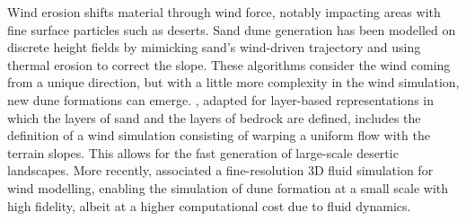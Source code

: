 
\smallConclusion

Wind erosion shifts material through wind force, notably impacting areas with fine surface particles such as deserts.  
Sand dune generation has been modelled on discrete height fields \cite{Roa2004} by mimicking sand's wind-driven trajectory and using thermal erosion to correct the slope. These algorithms consider the wind coming from a unique direction, but with a little more complexity in the wind simulation, new dune formations can emerge. \cite{Paris2019b}, adapted for layer-based representations in which the layers of sand and the layers of bedrock are defined, includes the definition of a wind simulation consisting of warping a uniform flow with the terrain slopes. This allows for the fast generation of large-scale desertic landscapes. More recently, \cite{Rosset2024} associated a fine-resolution 3D fluid simulation for wind modelling, enabling the simulation of dune formation at a small scale with high fidelity, albeit at a higher computational cost due to fluid dynamics.

